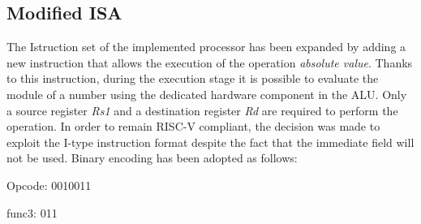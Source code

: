 \subsection{Modified ISA}
The Istruction set of the implemented processor has been expanded by adding a new instruction that allows the execution of the operation \textit{absolute value}. Thanks to this instruction, during the execution stage it is possible to evaluate the module of a number using the dedicated hardware component in the ALU. Only a source register \textit{Rs1} and a destination register \textit{Rd} are required to perform the operation. In order to remain RISC-V compliant, the decision was made to exploit the I-type instruction format despite the fact that the immediate field will not be used.
Binary encoding has been adopted as follows:
\begin{description}
    \item{Opcode:} 0010011
    \item{func3:} 011
\end{description}
